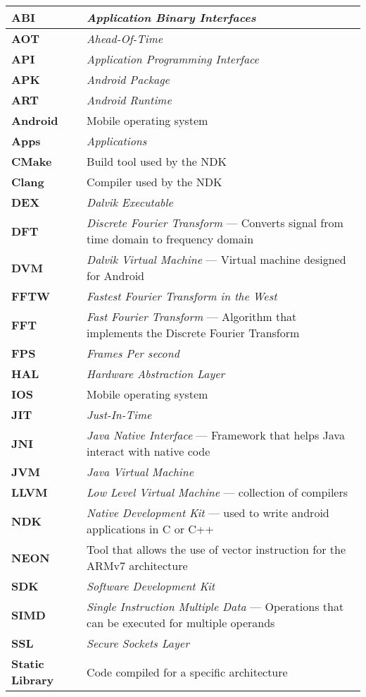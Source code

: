 \begin{tabular}{lp{12cm}}
\textbf{ABI} & \emph{Application Binary Interfaces}\\\hline
\textbf{AOT} & \emph{Ahead-Of-Time}\\\hline
\textbf{API} & \emph{Application Programming Interface}\\\hline
\textbf{APK} & \emph{Android Package}\\\hline
\textbf{ART} & \emph{Android Runtime}\\\hline
\textbf{Android} & Mobile operating system\\\hline
\textbf{Apps} & \emph{Applications}\\\hline
\textbf{CMake} & Build tool used by the NDK\\\hline
\textbf{Clang} & Compiler used by the NDK\\\hline
\textbf{DEX} & \emph{Dalvik Executable}\\\hline
\textbf{DFT} & \textit{Discrete Fourier Transform} --- Converts signal from time domain to frequency domain\\\hline
\textbf{DVM} & \textit{Dalvik Virtual Machine} --- Virtual machine designed for Android\\\hline
\textbf{FFTW} & \emph{Fastest Fourier Transform in the West}\\\hline
\textbf{FFT} & \textit{Fast Fourier Transform} --- Algorithm that implements the Discrete Fourier Transform\\\hline
\textbf{FPS} & \emph{Frames Per second}\\\hline
\textbf{HAL} & \emph{Hardware Abstraction Layer}\\\hline
\textbf{IOS} & Mobile operating system\\\hline
\textbf{JIT} & \emph{Just-In-Time}\\\hline
\textbf{JNI} & \textit{Java Native Interface} --- Framework that helps Java interact with native code\\\hline
\textbf{JVM} & \emph{Java Virtual Machine}\\\hline
\textbf{LLVM} & \emph{Low Level Virtual Machine} --- collection of compilers\\\hline
\textbf{NDK} & \textit{Native Development Kit} --- used to write android applications in C or C++\\\hline
\textbf{NEON} & Tool that allows the use of vector instruction for the ARMv7 architecture\\\hline
\textbf{SDK} & \emph{Software Development Kit}\\\hline
\textbf{SIMD} & \textit{Single Instruction Multiple Data} --- Operations that can be executed for multiple operands\\\hline
\textbf{SSL} & \emph{Secure Sockets Layer}\\\hline
\textbf{Static Library} & Code compiled for a specific architecture\\\hline
\end{tabular}
